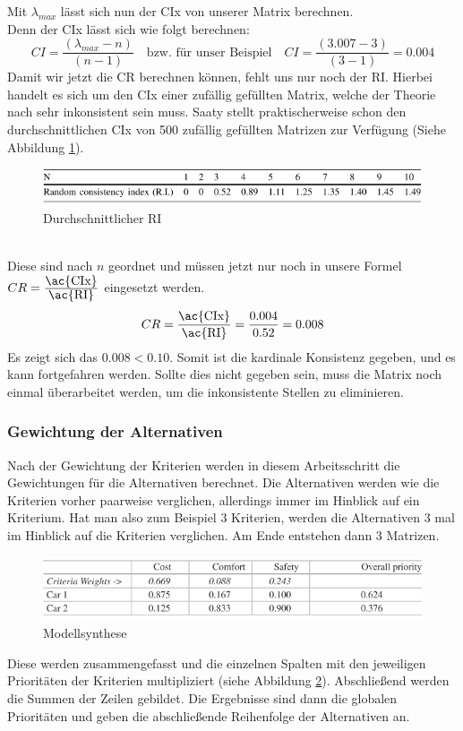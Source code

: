 Mit $\lambda_{max}$ lässt sich nun der \ac{CIx} von unserer Matrix berechnen. \\
Denn der \ac{CIx} lässt sich wie folgt berechnen:\autocite[Vgl.][S.14]{Mu.2018}
\[CI=\frac{(\lambda_{max}-n)}{(n-1)}\quad \mbox{bzw. für unser Beispiel}\quad CI=\frac{(3.007-3)}{(3-1)}=0.004\]
Damit wir jetzt die \ac{CR} berechnen können, fehlt uns nur noch der \ac{RI}. Hierbei handelt es sich um den \ac{CIx} einer zufällig gefüllten Matrix, welche der Theorie nach sehr inkonsistent sein muss. Saaty stellt praktischerweise schon den durchschnittlichen \ac{CIx} von 500 zufällig gefüllten Matrizen zur Verfügung (Siehe Abbildung \ref{img:ri}).\\
\begin{figure}[h!]
	\centering
	\includegraphics[scale = 0.9]{img/RI.png}
	\caption{Durchschnittlicher RI}
	\label{img:ri}
\end{figure}\\
Diese sind nach $n$ geordnet und müssen jetzt nur noch in unsere Formel $CR=\frac{\mbox{\ac{CIx}}}{\mbox{\ac{RI}}}$ eingesetzt werden.
\[CR=\frac{\mbox{\ac{CIx}}}{\mbox{\ac{RI}}}=\frac{0.004}{0.52}=0.008\]
Es zeigt sich das $0.008<0.10$. Somit ist die kardinale Konsistenz gegeben, und es kann fortgefahren werden. Sollte dies nicht gegeben sein, muss die Matrix noch einmal überarbeitet werden, um die inkonsistente Stellen zu eliminieren.\autocite[Vgl.][S.108]{Fink.2006}
\subsubsection{Gewichtung der Alternativen}
Nach der Gewichtung der Kriterien werden in diesem Arbeitsschritt die Gewichtungen für die Alternativen berechnet. Die Alternativen werden wie die Kriterien vorher paarweise verglichen, allerdings immer im Hinblick auf ein Kriterium. Hat man also zum Beispiel 3 Kriterien, werden die Alternativen 3 mal im Hinblick auf die Kriterien verglichen. Am Ende entstehen dann 3 Matrizen. 
\begin{figure}[h!]
	\centering
	\includegraphics[scale = 0.9]{img/All.png}
	\caption{Modellsynthese}
	\label{img:all}
\end{figure}
Diese werden zusammengefasst und die einzelnen Spalten mit den jeweiligen Prioritäten der Kriterien multipliziert\autocite[Vgl.][S.19]{Mu.2018} (siehe Abbildung \ref{img:all}). Abschließend werden die Summen der Zeilen gebildet. Die Ergebnisse sind dann die globalen Prioritäten und geben die abschließende Reihenfolge der Alternativen an. 
